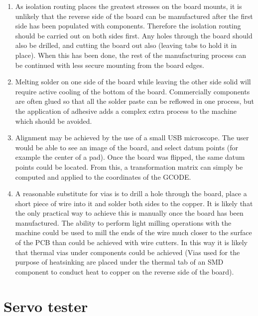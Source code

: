 \documentclass[a4paper,11pt]{article}  %
\begin{document}
\begin{enumerate}
	\item	As isolation routing places the greatest stresses on the board mounts, it is unlikely that the reverse side of the board can be manufactured
			after the first side has been populated with components. Therefore the isolation routing should be carried out on both sides first. Any holes
			through the board should also be drilled, and cutting the board out also (leaving tabs to hold it in place). When this has been done, the
			rest of the manufacturing process can be continued with less secure mounting from the board edges.
	\item	Melting solder on one side of the board while leaving the other side solid will require active cooling of the bottom of the board. Commercially
			components are often glued so that all the solder paste can be reflowed in one process, but the application of adhesive adds a complex extra
			process to the machine which should be avoided.
	\item	Alignment may be achieved by the use of a small USB microscope. The user would be able to see an image of the board, and select datum points (for
			example the center of a pad). Once the board was flipped, the same datum points could be located. From this, a transformation matrix can simply
			be computed and applied to the coordinates of the GCODE.
	\item	A reasonable substitute for vias is to drill a hole through the board, place a short piece of wire into it and solder both sides to the copper.
			It is likely that the only practical way to achieve this is manually once the board has been manufactured. The ability to perform light milling
			operations with the machine could be used to mill the ends of the wire much closer to the surface of the PCB than could be achieved with wire cutters.
			In this way it is likely that thermal vias under components could be achieved (Vias used for the purpose of heatsinking are placed under the thermal
			tab of an SMD component to conduct heat to copper on the reverse side of the board).
\end{enumerate}

\newpage
\appendix
\appendixpage
\addappheadtotoc
\section{Servo tester}
\end{document}
